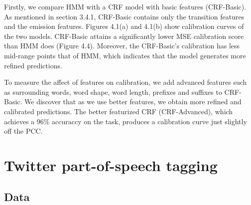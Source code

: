 Firstly, we compare HMM with a CRF model with basic features (CRF-Basic). As mentioned in section 3.4.1, CRF-Basic contains only the transition features and the emission features. Figures 4.1(a) and 4.1(b) show calibration curves of the two models. CRF-Basic attains a significantly lower MSE calibration score than HMM does (Figure 4.4). Moreover, the CRF-Basic's calibration has less mid-range points that of HMM, which indicates that the model generates more refined predictions.

To measure the affect of features on calibration, we add advanced features such as surrounding words, word shape, word length, prefixes and suffixes to CRF-Basic. We discover that as we use better features, we obtain more refined and calibrated predictions. The better featurized CRF (CRF-Advanced), which achieves a 96\% accuraccy on the task, produces a calibration curve just slightly off the PCC. 

\section{Twitter part-of-speech tagging}
\subsection{Data}

